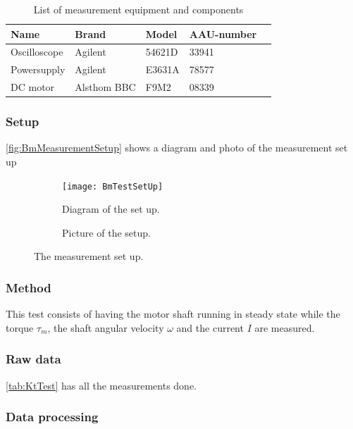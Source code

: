 \begin{table}[htbp]
	\centering
	\caption{List of measurement equipment and components}\label{tab_appendix:BmSetUp}
	
	\begin{tabularx}{\textwidth}{lXXXX}
		Name 				& Brand	& Model & AAU-number									\\ \toprule \rowcolor{lightGrey}
		Oscilloscope	& Agilent & 54621D & 33941 	\\
		Powersupply	& Agilent & E3631A & 78577\\ \rowcolor{lightGrey}
		DC motor & Alsthom BBC & F9M2& 08339
	\end{tabularx}
\end{table}

\subsubsection*{Setup}
\autoref{fig:BmMeasurementSetup} shows a diagram and photo of the measurement set up
\begin{figure}[htbp]
	\centering
	\begin{subfigure}{0.50\textwidth}
		\texttt{[image: BmTestSetUp]}
		\caption{Diagram of the set up.} \label{fig:BmMeasurementDiagram}
	\end{subfigure}
	\begin{subfigure}{0.40\textwidth}
		\caption{Picture of the setup.} \label{fig:BmMeasurementPictures}
	\end{subfigure}
	\caption{The measurement set up.} \label{fig:BmMeasurementSetup}   
\end{figure}

\subsubsection*{Method}
This test consists of having the motor shaft running in steady state while the torque $\tau_m$, the shaft angular velocity $\omega$ and the current $I$ are measured.

\subsubsection*{Raw data}
\autoref{tab:KtTest} has all the measurements done.


\subsubsection*{Data processing}

